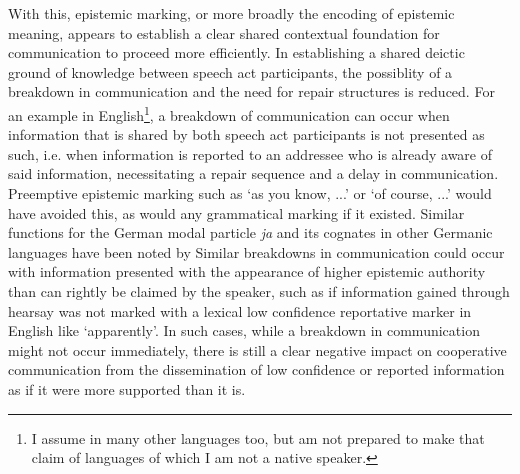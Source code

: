 With this, epistemic marking, or more broadly the encoding of epistemic meaning, appears to establish a clear shared contextual foundation for communication to proceed more efficiently. In establishing a shared deictic ground of knowledge between speech act participants, the possiblity of a breakdown in communication and the need for repair structures is reduced. For an example in English\footnote{I assume in many other languages too, but am not prepared to make that claim of languages of which I am not a native speaker.}, a breakdown of communication can occur when information that is shared by both speech act participants is not presented as such, i.e. when information is reported to an addressee who is already aware of said information, necessitating a repair sequence and a delay in communication. Preemptive epistemic marking such as `as you know, ...' or `of course, ...' would have avoided this, as would any grammatical marking if it existed. Similar functions for the German modal particle \textit{ja} and its cognates in other Germanic languages have been noted by  Similar breakdowns in communication could occur with information presented with the appearance of higher epistemic authority than can rightly be claimed by the speaker, such as if information gained through hearsay was not marked with a lexical low confidence reportative marker in English like `apparently'. In such cases, while a breakdown in communication might not occur immediately, there is still a clear negative impact on cooperative communication from the dissemination of low confidence or reported information as if it were more supported than it is.

